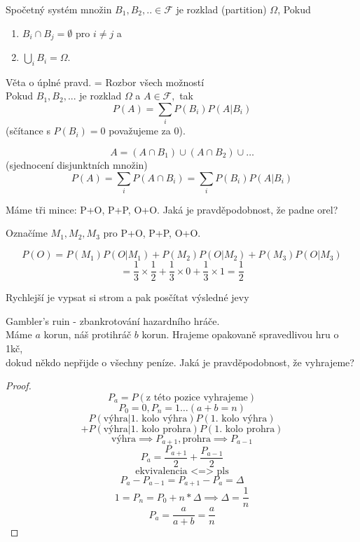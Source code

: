 \documentclass[../main.tex]{subfiles}
\begin{document}
\begin{definition}
    Spočetný systém množin $B_1,B_2,..\in \mathcal{F}$ je rozklad (partition) $\Omega$, Pokud
    \begin{enumerate}
        \item $B_i \cap B_j = \emptyset$ pro $i \neq j$ a
        \item $\bigcup_i B_i = \Omega$.
    \end{enumerate}
\end{definition}
\begin{theorem}
    Věta o úplné pravd. = Rozbor všech možností
    \\ Pokud $B_1,B_2,...$ je rozklad $\Omega$ a $A \in \mathcal{F},$ tak
    \[P(A) = \sum_i P(B_i)P(A|B_i)\]
    (sčítance s $P(B_i) = 0$ považujeme za $0$).

    \[A = (A\cap B_1) \cup (A\cap B_2) \cup \dots\]
    (sjednocení disjunktních množin)
    \[P(A) = \sum_i P(A\cap B_i) = \sum_i P(B_i)P(A|B_i)\]
\end{theorem}
\begin{example}
    Máme tři mince: P+O, P+P, O+O. Jaká je pravděpodobnost, že padne orel?

    Označíme $M_1, M_2, M_3$ pro P+O, P+P, O+O.
    
    \[P(O) = P(M_1)P(O|M_1) + P(M_2)P(O|M_2) + P(M_3)P(O|M_3)\]
    \[ = \frac{1}{3}\times \frac{1}{2} + \frac{1}{3}\times 0 + \frac{1}{3}\times 1 = \frac{1}{2}\]

    Rychlejší je vypsat si strom a pak posčítat výsledné jevy\\
\end{example}
\begin{example}
    Gambler's ruin - zbankrotování hazardního hráče.\\
    Máme $a$ korun, náš protihráč $b$ korun. Hrajeme opakovaně spravedlivou hru o 1kč,\\
    dokud někdo nepřijde o všechny peníze. Jaká je pravděpodobnost, že vyhrajeme?
\begin{proof}
    \[P_a = P(\text{z této pozice vyhrajeme})\]
    \[P_0 = 0, P_n = 1 \dots (a+b = n)\]
    \[P(\text{výhra}|\text{1. kolo výhra})P(\text{1. kolo výhra})\]
    \[+ P(\text{výhra}|\text{1. kolo prohra})P(\text{1. kolo prohra})\]
    \[\text{výhra}\implies P_{a+1}, \text{prohra}\implies P_{a-1}\]
    \[P_a = \frac{P_{a+1}}{2} + \frac{P_{a-1}}{2}\]
    \[\text{ekvivalencia <=> pls}\]
    \[P_a - P_{a-1} = P_{a+1} - P_a = \Delta\]
    \[1 = P_n = P_0 + n*\Delta \implies \Delta = \frac{1}{n}\]
    \[P_a = \frac{a}{a+b} = \frac{a}{n}\]
\end{proof}
\end{example}
\end{document}
